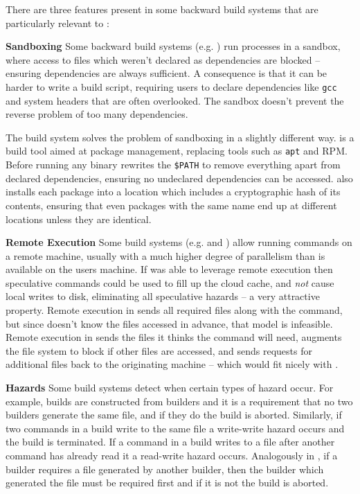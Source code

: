\postparagraphs

\noindent There are three features present in some backward build systems that are particularly relevant to \Rattle:

\textbf{Sandboxing} Some backward build systems (e.g. \Bazel \cite{bazel}) run processes in a sandbox, where access to files which weren't declared as dependencies are blocked -- ensuring dependencies are always sufficient. A consequence is that it can be harder to write a \Bazel build script, requiring users to declare dependencies like \texttt{gcc} and system headers that are often overlooked. The sandbox doesn't prevent the reverse problem of too many dependencies.

The \Nix build system \cite{nix} solves the problem of sandboxing in a slightly different way. \Nix is a build tool aimed at package management, replacing tools such as \texttt{apt} and RPM. Before running any binary \Nix rewrites the \texttt{\$PATH} to remove everything apart from declared dependencies, ensuring no undeclared dependencies can be accessed. \Nix also installs each package into a location which includes a cryptographic hash of its contents, ensuring that even packages with the same name end up at different locations unless they are identical.

\textbf{Remote Execution} Some build systems (e.g. \Bazel and \BuildXL \cite{buildxl}) allow running commands on a remote machine, usually with a much higher degree of parallelism than is available on the users machine. If \Rattle was able to leverage remote execution then speculative commands could be used to fill up the cloud cache, and \emph{not} cause local writes to disk, eliminating all speculative hazards -- a very attractive property. Remote execution in \Bazel sends all required files along with the command, but since \Rattle doesn't know the files accessed in advance, that model is infeasible. Remote execution in \BuildXL sends the files it thinks the command will need, augments the file system to block if other files are accessed, and sends requests for additional files back to the originating machine -- which would fit nicely with \Rattle.

\textbf{Hazards} Some build systems detect when certain types of hazard occur. For example, \Pluto \cite{erdweg2015sound} builds are constructed from builders and it is a requirement that no two builders generate the same file, and if they do the build is aborted. Similarly, if two commands in a \Rattle build write to the same file a write-write hazard occurs and the build is terminated. If a command in a \Rattle build writes to a file after another command has already read it a read-write hazard occurs. Analogously in \Pluto, if a builder requires a file generated by another builder, then the builder which generated the file must be required first and if it is not the build is aborted. 

